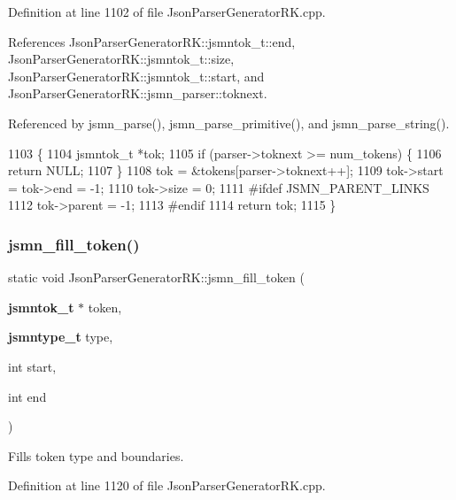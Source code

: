 Definition at line 1102 of file Json\+Parser\+Generator\+R\+K.\+cpp.



References Json\+Parser\+Generator\+R\+K\+::jsmntok\+\_\+t\+::end, Json\+Parser\+Generator\+R\+K\+::jsmntok\+\_\+t\+::size, Json\+Parser\+Generator\+R\+K\+::jsmntok\+\_\+t\+::start, and Json\+Parser\+Generator\+R\+K\+::jsmn\+\_\+parser\+::toknext.



Referenced by jsmn\+\_\+parse(), jsmn\+\_\+parse\+\_\+primitive(), and jsmn\+\_\+parse\+\_\+string().


\begin{DoxyCode}
1103                                               \{
1104     jsmntok\_t *tok;
1105     \textcolor{keywordflow}{if} (parser->toknext >= num\_tokens) \{
1106         \textcolor{keywordflow}{return} NULL;
1107     \}
1108     tok = &tokens[parser->toknext++];
1109     tok->start = tok->end = -1;
1110     tok->size = 0;
1111 \textcolor{preprocessor}{#ifdef JSMN\_PARENT\_LINKS}
1112     tok->parent = -1;
1113 \textcolor{preprocessor}{#endif}
1114     \textcolor{keywordflow}{return} tok;
1115 \}
\end{DoxyCode}
\mbox{\label{namespace_json_parser_generator_r_k_a2b59144adb776aecb8bf1ad705aad7f5}} 
\subsubsection{jsmn\+\_\+fill\+\_\+token()}
{\footnotesize\ttfamily static void Json\+Parser\+Generator\+R\+K\+::jsmn\+\_\+fill\+\_\+token (\begin{DoxyParamCaption}\item[{\textbf{ jsmntok\+\_\+t} $\ast$}]{token,  }\item[{\textbf{ jsmntype\+\_\+t}}]{type,  }\item[{int}]{start,  }\item[{int}]{end }\end{DoxyParamCaption})\hspace{0.3cm}{\ttfamily [static]}}

Fills token type and boundaries. 

Definition at line 1120 of file Json\+Parser\+Generator\+R\+K.\+cpp.



